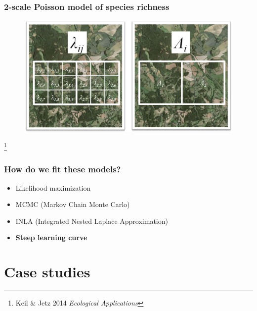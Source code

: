 \documentclass[xcolor=x11names, compress]{beamer}
\renewcommand{\(}{\begin{columns}}
\renewcommand{\)}{\end{columns}}
\newcommand{\<}[1]{\begin{column}{#1}}
\renewcommand{\>}{\end{column}}
\begin{document}
\begin{frame}
\frametitle{2-scale Poisson model of species richness}


\begin{figure}
	\includegraphics[width=0.65\linewidth]{fig/scalings1.png}
\end{figure}


\let\thefootnote\relax\footnote{Keil \& Jetz 2014 \textit{Ecological Applications}}
\end{frame}

\begin{frame}
\frametitle{How do we fit these models?}

\begin{itemize}[<+(1)->]
	\item Likelihood maximization
	\item MCMC (Markov Chain Monte Carlo)
	\item INLA (Integrated Nested Laplace Approximation)
	\item \textbf{Steep learning curve}
\end{itemize}

\end{frame}

\section{Case studies}
\end{document}
